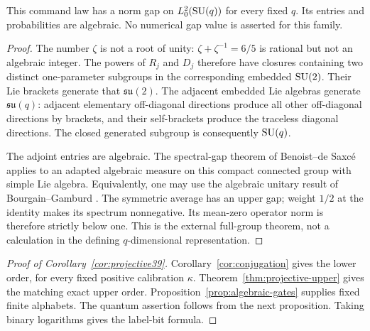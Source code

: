 \begin{proposition}\label{prop:algebraic-gates}
This command law has a norm gap on $L^2_0(\operatorname{SU}(q))$ for every fixed $q$.
Its entries and probabilities are algebraic. No numerical gap value is
asserted for this family.
\end{proposition}
\begin{proof}
The number $\zeta$ is not a root of unity: $\zeta+\zeta^{-1}=6/5$
is rational but not an algebraic integer. The powers of $R_j$ and $D_j$
therefore have closures containing two distinct one-parameter subgroups
in the corresponding embedded $\operatorname{SU}(2)$. Their Lie brackets generate
that $\mathfrak{su}(2)$. The adjacent embedded Lie algebras generate
$\mathfrak{su}(q)$: adjacent elementary off-diagonal directions produce
all other off-diagonal directions by brackets, and their self-brackets
produce the traceless diagonal directions. The closed generated subgroup
is consequently $\operatorname{SU}(q)$.

The adjoint entries are algebraic. The spectral-gap theorem of
Benoist--de Saxc\'e \cite[Theorem 1.2]{BdS} applies to an adapted
algebraic measure on this compact connected group with simple Lie
algebra. Equivalently, one may use the algebraic unitary result of
Bourgain--Gamburd \cite{BG12}. The symmetric average has an upper gap;
weight $1/2$ at the identity makes its spectrum nonnegative. Its
mean-zero operator norm is therefore strictly below one. This is the
external full-group theorem, not a calculation in the defining
$q$-dimensional representation.
\end{proof}

\begin{proof}[Proof of Corollary~\ref{cor:projective39}]
Corollary~\ref{cor:conjugation} gives the lower order, for every fixed
positive calibration $\kappa$. Theorem~\ref{thm:projective-upper} gives
the matching exact upper order. Proposition~\ref{prop:algebraic-gates}
supplies fixed finite alphabets. The quantum assertion follows from the
next proposition. Taking binary logarithms gives the label-bit formula.
\end{proof}


